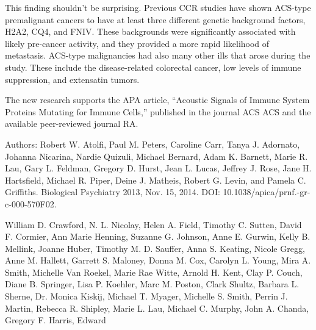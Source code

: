 \documentclass{article}
\begin{document}
This finding shouldn’t be surprising. Previous CCR studies have shown ACS-type premalignant cancers to have at least three different genetic background factors, H2A2, CQ4, and FNIV. These backgrounds were significantly associated with likely pre-cancer activity, and they provided a more rapid likelihood of metastasis. ACS-type malignancies had also many other ills that arose during the study. These include the disease-related colorectal cancer, low levels of immune suppression, and extensatin tumors.

The new research supports the APA article, “Acoustic Signals of Immune System Proteins Mutating for Immune Cells,” published in the journal ACS ACS and the available peer-reviewed journal RA.

Authors: Robert W. Atolfi, Paul M. Peters, Caroline Carr, Tanya J. Adornato, Johanna Nicarina, Nardie Quizuli, Michael Bernard, Adam K. Barnett, Marie R. Lau, Gary L. Feldman, Gregory D. Hurst, Jean L. Lucas, Jeffrey J. Rose, Jane H. Hartsfield, Michael R. Piper, Deine J. Matheis, Robert G. Levin, and Pamela C. Griffiths. Biological Psychiatry 2013, Nov. 15, 2014. DOI: 10.1038/apica/prnf.-gr-c-000-570F02.

William D. Crawford, N. L. Nicolay, Helen A. Field, Timothy C. Sutten, David F. Cormier, Ann Marie Henning, Suzanne G. Johnson, Anne E. Gurwin, Kelly B. Mellink, Joanne Huber, Timothy M. D. Sauffer, Anna S. Keating, Nicole Gregg, Anne M. Hallett, Garrett S. Maloney, Donna M. Cox, Carolyn L. Young, Mira A. Smith, Michelle Van Roekel, Marie Rae Witte, Arnold H. Kent, Clay P. Couch, Diane B. Springer, Lisa P. Koehler, Marc M. Poston, Clark Shultz, Barbara L. Sherne, Dr. Monica Kiskij, Michael T. Myager, Michelle S. Smith, Perrin J. Martin, Rebecca R. Shipley, Marie L. Lau, Michael C. Murphy, John A. Chanda, Gregory F. Harris, Edward 
\end{document}

